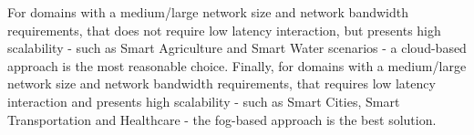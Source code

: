 For domains with a medium/large network size and network bandwidth requirements, that does not require
low latency interaction, but presents high scalability - such as Smart Agriculture and Smart Water
scenarios - a cloud-based approach is the most reasonable choice. Finally, for domains with a
medium/large network size and network bandwidth requirements, that requires low latency interaction
and presents high scalability - such as Smart Cities, Smart Transportation and Healthcare - the
fog-based approach is the best solution.
